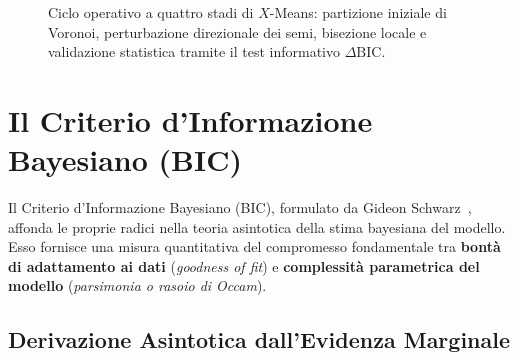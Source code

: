 \begin{figure}[H]
\caption{Ciclo operativo a quattro stadi di $X$-Means: partizione iniziale di Voronoi, perturbazione direzionale dei semi, bisezione locale e validazione statistica tramite il test informativo $\Delta\mathrm{BIC}$.}
\label{fig:dm-xmeans-cycle}
\end{figure}

\FloatBarrier
\section{Il Criterio d'Informazione Bayesiano (BIC)}
\label{sec:dm-bic-theory}

Il Criterio d'Informazione Bayesiano (BIC), formulato da Gideon Schwarz~\cite{schwarz1978}, affonda le proprie radici nella teoria asintotica della stima bayesiana del modello. Esso fornisce una misura quantitativa del compromesso fondamentale tra \textbf{bontà di adattamento ai dati} (\textit{goodness of fit}) e \textbf{complessità parametrica del modello} (\textit{parsimonia o rasoio di Occam}).

\FloatBarrier
\subsection{Derivazione Asintotica dall'Evidenza Marginale}


